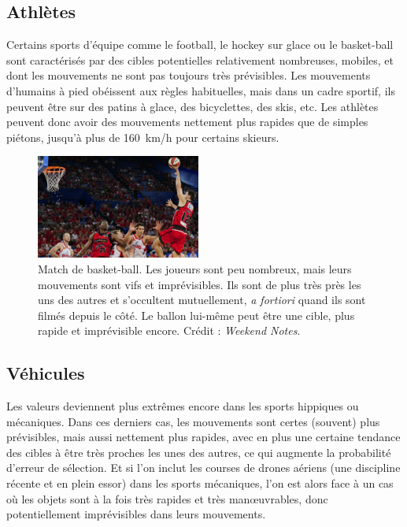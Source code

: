 	\subsection{Athlètes}
	Certains sports d'équipe comme le football, le hockey sur glace ou le basket-ball sont caractérisés par des cibles potentielles relativement nombreuses, mobiles, et dont les mouvements ne sont pas toujours très prévisibles. Les mouvements d'humains à pied obéissent aux règles habituelles, mais dans un cadre sportif, ils peuvent être sur des patins à glace, des bicyclettes, des skis, etc. Les athlètes peuvent donc avoir des mouvements nettement plus rapides que de simples piétons, jusqu'à plus de 160~km/h pour certains skieurs\footnotemark.
	
	
	\begin{figure}
		\centering
		\includegraphics[width=0.48\textwidth]{figures/ch1/basket}
		\caption[Match de basket-ball.]{Match de basket-ball. Les joueurs sont peu nombreux, mais leurs mouvements sont vifs et imprévisibles. Ils sont de plus très près les uns des autres et s'occultent mutuellement, \emph{a fortiori} quand ils sont filmés depuis le côté. Le ballon lui-même peut être une cible, plus rapide et imprévisible encore. Crédit : \emph{Weekend Notes}\footnotemark.}
		\label{fig:basketball}
	\end{figure}
	
	
	\subsection{Véhicules}
	Les valeurs deviennent plus extrêmes encore dans les sports hippiques ou mécaniques. Dans ces derniers cas, les mouvements sont certes (souvent) plus prévisibles, mais aussi nettement plus rapides, avec en plus une certaine tendance des cibles à être très proches les unes des autres, ce qui augmente la probabilité d'erreur de sélection. Et si l'on inclut les courses de drones aériens\footnotemark{} (une discipline récente et en plein essor) dans les sports mécaniques, l'on est alors face à un cas où les objets sont à la fois très rapides et très manœuvrables, donc potentiellement imprévisibles dans leurs mouvements.
	
